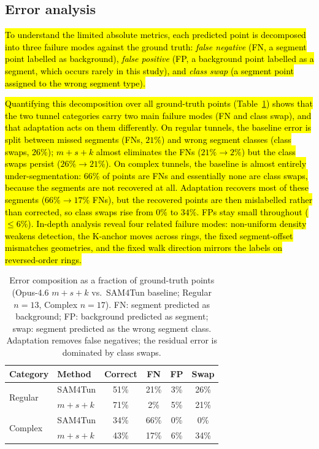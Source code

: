 \documentclass[a4paper,fleqn]{cas-dc}
\begin{document}
{\subsection{Error analysis}\label{sec:error-analysis}

\hl{To understand the limited absolute metrics, each predicted point is decomposed into three failure modes against the ground truth: \textit{false negative} (FN, a segment point labelled as background), \textit{false positive} (FP, a background point labelled as a segment, which  occurs rarely in this study), and \textit{class swap} (a segment point assigned to the wrong segment type).}

\hl{Quantifying this decomposition over all ground-truth points (Table~\ref{tab:error-composition}) shows that the two tunnel categories carry two main failure modes (FN and class swap), and that adaptation acts on them differently. On regular tunnels, the baseline error is split between missed segments (FNs, $21\%$) and wrong segment classes (class swaps, $26\%$); \mbox{$m+s+k$} almost eliminates the FNs ($21\%\rightarrow2\%$) but the class swaps persist ($26\%\rightarrow21\%$). On complex tunnels, the baseline is almost entirely under-segmentation: $66\%$ of points are FNs and essentially none are class swaps, because the segments are not recovered at all. Adaptation recovers most of these segments ($66\%\rightarrow17\%$ FNs), but the recovered points are then mislabelled rather than corrected, so class swaps rise from $0\%$ to $34\%$. FPs stay small throughout ($\leq6\%$). In-depth analysis reveal four related failure modes: non-uniform density weakens detection, the K-anchor moves across rings, the fixed segment-offset mismatches geometries, and the fixed walk direction mirrors the labels on reversed-order rings.}

\begin{table}[ht]
\caption{Error composition as a fraction of ground-truth points (Opus-4.6 \mbox{$m+s+k$} vs.\ SAM4Tun baseline; Regular $n=13$, Complex $n=17$). FN: segment predicted as background; FP: background predicted as segment; swap: segment predicted as the wrong segment class. Adaptation removes false negatives; the residual error is dominated by class swaps.}\label{tab:error-composition}
\begin{tabular*}{\tblwidth}{@{} l l c c c c @{}}
\toprule
Category & Method & Correct & FN & FP & Swap \\
\midrule
\multirow{2}{*}{Regular}
  & SAM4Tun     & 51\% & 21\% & 3\% & 26\% \\
  & \mbox{$m+s+k$} & 71\% & 2\%  & 5\% & 21\% \\
\midrule
\multirow{2}{*}{Complex}
  & SAM4Tun     & 34\% & 66\% & 0\% & 0\%  \\
  & \mbox{$m+s+k$} & 43\% & 17\% & 6\% & 34\% \\
\bottomrule
\end{tabular*}
\end{table}

}
\end{document}
